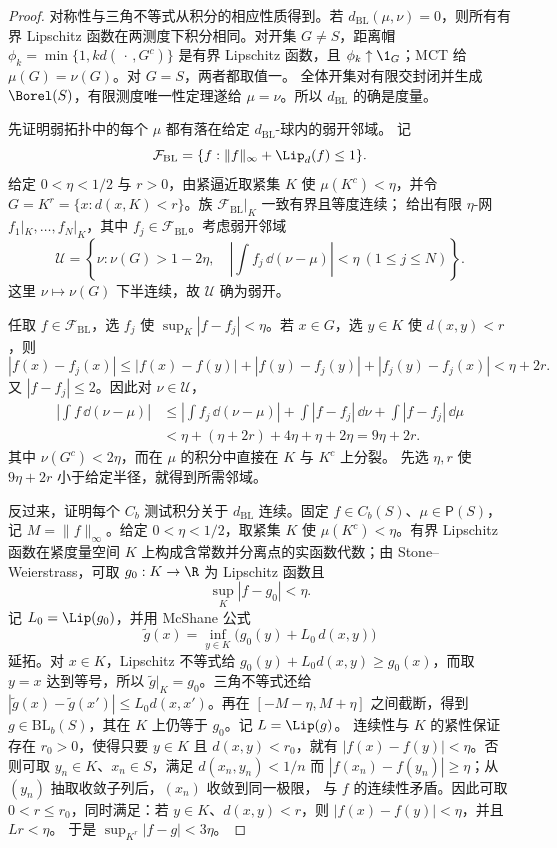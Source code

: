 \begin{proof}
对称性与三角不等式从积分的相应性质得到。若
$d_{\mathrm{BL}}(\mu,\nu)=0$，则所有有界 Lipschitz 函数在两测度下积分相同。对开集
$G\ne S$，距离帽
$\phi_k=\min\{1,kd(\,\cdot\,,G^c)\}$ 是有界 Lipschitz 函数，且
$\phi_k\uparrow\1_G$；MCT 给 $\mu(G)=\nu(G)$。对 $G=S$，两者都取值一。
全体开集对有限交封闭并生成 $\Borel(S)$，有限测度唯一性定理遂给 $\mu=\nu$。所以
$d_{\mathrm{BL}}$ 的确是度量。

先证明弱拓扑中的每个 $\mu$ 都有落在给定 $d_{\mathrm{BL}}$-球内的弱开邻域。
记
\[
 \mathcal F_{\mathrm{BL}}
 =\{f:\|f\|_\infty+\Lip_d(f)\le1\}.
\]
给定 $0<\eta<1/2$ 与 $r>0$，由紧逼近取紧集 $K$ 使 $\mu(K^c)<\eta$，并令
$G=K^r=\{x:d(x,K)<r\}$。族 $\mathcal F_{\mathrm{BL}}|_K$ 一致有界且等度连续；
\ArzelaAscoli{} 给出有限 $\eta$-网 $f_1|_K,\ldots,f_N|_K$，其中
$f_j\in\mathcal F_{\mathrm{BL}}$。考虑弱开邻域
\[
 \mathcal U=\left\{\nu:
 \nu(G)>1-2\eta,\quad
 \left|\int f_j\,\dd(\nu-\mu)\right|<\eta
 \ (1\le j\le N)\right\}.
\]
这里 $\nu\mapsto\nu(G)$ 下半连续，故 $\mathcal U$ 确为弱开。

任取 $f\in\mathcal F_{\mathrm{BL}}$，选 $f_j$ 使
$\sup_K|f-f_j|<\eta$。若 $x\in G$，选 $y\in K$ 使 $d(x,y)<r$，则
\[
 |f(x)-f_j(x)|
 \le |f(x)-f(y)|+|f(y)-f_j(y)|+|f_j(y)-f_j(x)|
 <\eta+2r.
\]
又 $|f-f_j|\le2$。因此对 $\nu\in\mathcal U$，
\[
\begin{aligned}
 \left|\int f\,\dd(\nu-\mu)\right|
 &\le \left|\int f_j\,\dd(\nu-\mu)\right|
    +\int|f-f_j|\,\dd\nu+\int|f-f_j|\,\dd\mu\\
 &<\eta+(\eta+2r)+4\eta+\eta+2\eta
 =9\eta+2r.
\end{aligned}
\]
其中 $\nu(G^c)<2\eta$，而在 $\mu$ 的积分中直接在 $K$ 与 $K^c$ 上分裂。
先选 $\eta,r$ 使 $9\eta+2r$ 小于给定半径，就得到所需邻域。

反过来，证明每个 $C_b$ 测试积分关于 $d_{\mathrm{BL}}$ 连续。固定
$f\in C_b(S)$、$\mu\in\mathsf P(S)$，记 $M=\|f\|_\infty$。给定
$0<\eta<1/2$，取紧集 $K$ 使 $\mu(K^c)<\eta$。有界 Lipschitz 函数在紧度量空间
$K$ 上构成含常数并分离点的实函数代数；由 Stone--Weierstrass，可取
$g_0:K\to\R$ 为 Lipschitz 函数且
\[
 \sup_K|f-g_0|<\eta.
\]
记 $L_0=\Lip(g_0)$，并用 McShane 公式
\[
 \widetilde g(x)=\inf_{y\in K}\bigl(g_0(y)+L_0\,d(x,y)\bigr)
\]
延拓。对 $x\in K$，Lipschitz 不等式给
$g_0(y)+L_0d(x,y)\ge g_0(x)$，而取 $y=x$ 达到等号，所以
$\widetilde g|_K=g_0$。三角不等式还给
$|\widetilde g(x)-\widetilde g(x')|\le L_0d(x,x')$。再在
$[-M-\eta,M+\eta]$ 之间截断，得到
$g\in\mathrm{BL}_b(S)$，其在 $K$ 上仍等于 $g_0$。记 $L=\Lip(g)$。
连续性与 $K$ 的紧性保证存在 $r_0>0$，使得只要 $y\in K$ 且
$d(x,y)<r_0$，就有 $|f(x)-f(y)|<\eta$。否则可取
$y_n\in K$、$x_n\in S$，满足 $d(x_n,y_n)<1/n$ 而
$|f(x_n)-f(y_n)|\ge\eta$；从 $(y_n)$ 抽取收敛子列后，$(x_n)$ 收敛到同一极限，
与 $f$ 的连续性矛盾。因此可取 $0<r\le r_0$，同时满足：若
$y\in K$、$d(x,y)<r$，则 $|f(x)-f(y)|<\eta$，并且 $Lr<\eta$。
于是 $\sup_{K^r}|f-g|<3\eta$。


\end{proof}
